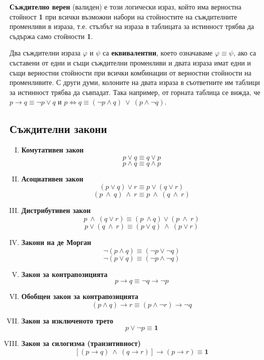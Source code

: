 {\bf Съждително верен} (валиден) е този логически израз, който има верностна стойност {\bf 1} при всички възможни набори на
стойностите на съждителните променливи в израза, т.е. стълбът на израза в таблицата за истинност трябва да съдържа само 
стойности {\bf 1}. 

Два съждителни израза $\varphi$ и $\psi$ са {\bf еквивалентни}, което означаваме $\varphi \equiv \psi$, ако са съставени от 
едни и същи съждителни променливи и двата израза имат едни и същи верностни стойности при всички комбинации от верностни 
стойности на променливите. С други думи, колоните на двата израза в съответните им таблици за истинност трябва да съвпадат.
Така например, от горната таблица се вижда, че 
$p\to q \equiv \neg p \vee q$ и $p \iff q \equiv (\neg{p}\wedge q)\ \vee\ (p\wedge \neg q)$.

\subsection*{Съждителни закони}

\begin{enumerate}[I)]
  \item
    {\bf Комутативен закон}
    \[p\vee q \equiv q\vee p\] 
    \[p \wedge q \equiv q \wedge p\]
  \item
    {\bf Асоциативен закон}
    \[(p\vee q)\vee r \equiv p\vee(q\vee r)\]
    \[(p\ \wedge\ q)\ \wedge\ r \equiv p\ \wedge\ (q\ \wedge\ r)\]
  \item
    {\bf Дистрибутивен закон}
    \[p\ \wedge\ (q \vee r) \equiv (p\ \wedge q)\vee (p\ \wedge\ r)\]
    \[p\vee (q\ \wedge\ r) \equiv (p\vee q)\ \wedge\ (p\vee r)\]
  \item
    {\bf Закони на де Морган}
    \[\neg(p \wedge q) \equiv (\neg p \vee \neg q)\]
    \[\neg(p\vee q) \equiv (\neg p \wedge \neg q)\]
  \item
    {\bf Закон за контрапозицията}
    \[p\rightarrow q \equiv \neg q \rightarrow \neg p\]
  \item
    {\bf Обобщен закон за контрапозицията}
    \[(p \wedge q)\rightarrow r \equiv (p \wedge \neg r) \rightarrow \neg q\]
  \item
    {\bf Закон за изключеното трето}
    \[p\vee \neg p \equiv {\mathbf 1}\]
  \item
    {\bf Закон за силогизма (транзитивност)}
    \[[(p\rightarrow q)\ \wedge\ (q\rightarrow r)] \rightarrow (p\rightarrow r) \equiv {\mathbf 1}\]
\end{enumerate}

